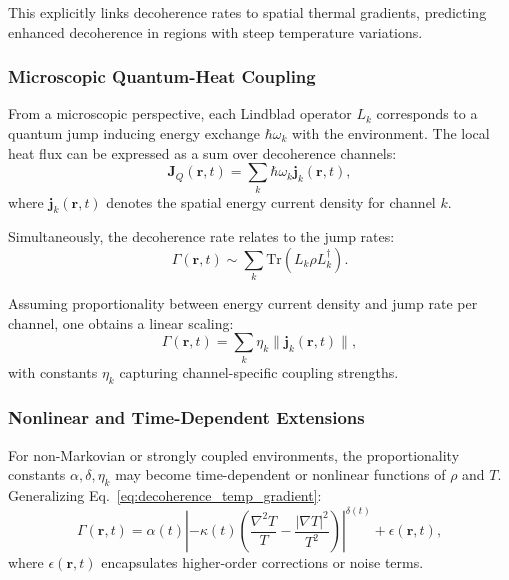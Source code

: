 \documentclass[12pt]{article}
\begin{document}
This explicitly links decoherence rates to spatial thermal gradients, predicting enhanced decoherence in regions with steep temperature variations.

\subsubsection*{Microscopic Quantum-Heat Coupling}

From a microscopic perspective, each Lindblad operator \(L_k\) corresponds to a quantum jump inducing energy exchange \(\hbar \omega_k\) with the environment. The local heat flux can be expressed as a sum over decoherence channels:
\begin{equation}
\mathbf{J}_Q(\mathbf{r}, t) = \sum_k \hbar \omega_k \mathbf{j}_k(\mathbf{r}, t),
\label{eq:heat_flux_channels}
\end{equation}
where \(\mathbf{j}_k(\mathbf{r}, t)\) denotes the spatial energy current density for channel \(k\).

Simultaneously, the decoherence rate relates to the jump rates:
\begin{equation}
\Gamma(\mathbf{r}, t) \sim \sum_k \mathrm{Tr} \left( L_k \rho L_k^\dagger \right).
\label{eq:decoherence_jump}
\end{equation}

Assuming proportionality between energy current density and jump rate per channel, one obtains a linear scaling:
\begin{equation}
\Gamma(\mathbf{r}, t) = \sum_k \eta_k \| \mathbf{j}_k(\mathbf{r}, t) \|,
\label{eq:gamma_j_relation}
\end{equation}
with constants \(\eta_k\) capturing channel-specific coupling strengths.

\subsubsection*{Nonlinear and Time-Dependent Extensions}

For non-Markovian or strongly coupled environments, the proportionality constants \(\alpha, \delta, \eta_k\) may become time-dependent or nonlinear functions of \(\rho\) and \(T\). Generalizing Eq.~\eqref{eq:decoherence_temp_gradient}:
\begin{equation}
\Gamma(\mathbf{r}, t) = \alpha(t) \left| -\kappa(t) \left( \frac{\nabla^2 T}{T} - \frac{|\nabla T|^2}{T^2} \right) \right|^{\delta(t)} + \epsilon(\mathbf{r}, t),
\label{eq:nonlinear_decoherence}
\end{equation}
where \(\epsilon(\mathbf{r}, t)\) encapsulates higher-order corrections or noise terms.
\end{document}
